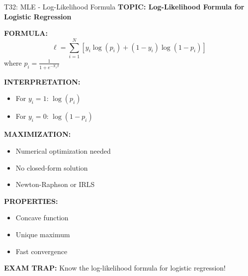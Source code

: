 \documentclass[8pt]{beamer}
\begin{document}
	\begin{frame}{T32: MLE - Log-Likelihood Formula}
		\fontsize{6.5}{7.5}\selectfont
		\textbf{TOPIC: Log-Likelihood Formula for Logistic Regression}
		
		\vspace{0.1cm}
		\textbf{FORMULA:}
		\[
		\ell = \sum_{i=1}^N [y_i \log(p_i) + (1-y_i)\log(1-p_i)]
		\]
		where $p_i = \frac{1}{1 + e^{-X_i\beta}}$
		
		\vspace{0.1cm}
		\textbf{INTERPRETATION:}
		\begin{itemize}
			\item For $y_i = 1$: $\log(p_i)$
			\item For $y_i = 0$: $\log(1-p_i)$
		\end{itemize}
		
		\vspace{0.1cm}
		\textbf{MAXIMIZATION:}
		\begin{itemize}
			\item Numerical optimization needed
			\item No closed-form solution
			\item Newton-Raphson or IRLS
		\end{itemize}
		
		\vspace{0.1cm}
		\textbf{PROPERTIES:}
		\begin{itemize}
			\item Concave function
			\item Unique maximum
			\item Fast convergence
		\end{itemize}
		
		\textcolor{myred}{\textbf{EXAM TRAP:}} Know the \textcolor{myblue}{log-likelihood formula} for logistic regression!
	\end{frame}
	
\end{document}
